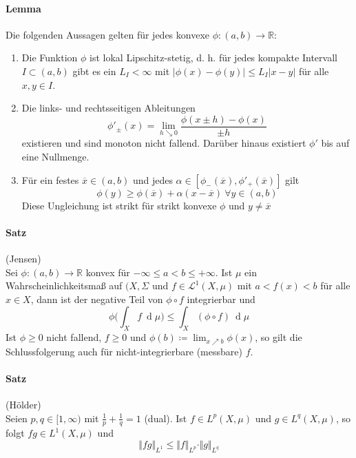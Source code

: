\documentclass[12pt,a4paper,fleqn]{article}
\def\d{{\operatorname{d}}}
\begin{document}
\paragraph{Lemma} Die folgenden Aussagen gelten für jedes konvexe $\phi: (a, b) \rightarrow \mathbb{R}$:
\begin{enumerate}
\item Die Funktion $\phi$ ist lokal Lipschitz-stetig, d. h. für jedes kompakte Intervall $I \subset (a, b)$ gibt es ein $L_I < \infty$ mit $\vert \phi(x) - \phi(y) \vert \leq L_I \vert x - y \vert$ für alle $x, y \in I$.
\item Die links- und rechtsseitigen Ableitungen
\begin{displaymath}
\phi'_{\pm}(x) = \lim_{h \searrow 0} \frac{\phi (x \pm h) - \phi (x)}{\pm h}
\end{displaymath}
existieren und sind monoton nicht fallend. Darüber hinaus existiert $\phi'$ bis auf eine Nullmenge.
\item Für ein festes $\overline{x} \in (a, b)$ und jedes $\alpha \in [\phi_-(\overline{x}), \phi'_+(\overline{x})]$ gilt
\begin{displaymath}
\phi (y) \geq \phi(\overline{x}) + \alpha(x - \overline{x})\ \forall y \in (a, b)
\end{displaymath}
Diese Ungleichung ist strikt für strikt konvexe $\phi$ und $y \not = \overline{x}$
\end{enumerate}

\paragraph{Satz} (Jensen)\\
Sei $\phi: (a, b) \rightarrow \mathbb{R}$ konvex für $-\infty \leq a < b \leq +\infty$. Ist $\mu$ ein Wahrscheinlichkeitsmaß auf $(X, \Sigma$ und $f \in \mathscr{L}^1(X, \mu)$ mit $a < f(x) < b$ für alle $x \in X$, dann ist der negative Teil von $\phi \circ f$ integrierbar und
\begin{displaymath}
\phi \bigg(\int_X f\ \d\mu \bigg) \leq \int_X (\phi \circ f)\ \d\mu 
\end{displaymath}
Ist $\phi \geq 0$ nicht fallend, $f \geq 0$ und $\phi(b) \coloneqq \lim_{x \nearrow b} \phi(x)$, so gilt die Schlussfolgerung auch für nicht-integrierbare (messbare) $f$.

\paragraph{Satz} (Hölder)\\
Seien $p, q \in [1, \infty)$ mit $\frac{1}{p} + \frac{1}{q} = 1$ (dual). Ist $f \in L^p(X, \mu)$ und $g \in L^{q}(X, \mu)$, so folgt $fg \in {L}^1(X, \mu)$ und 
\begin{displaymath}
\Vert fg \Vert_{L^1} \leq \Vert f \Vert_{L^p} \cdot \Vert g \Vert_{L^{q}}
\end{displaymath}
\end{document}
